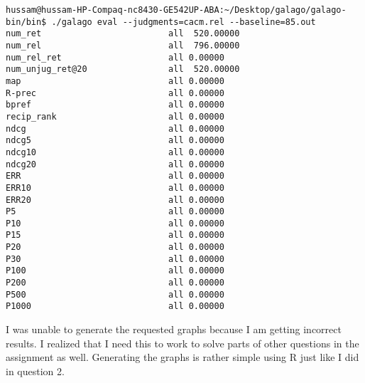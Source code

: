 \begin{lstlisting}[breakatwhitespace=〈false)]
hussam@hussam-HP-Compaq-nc8430-GE542UP-ABA:~/Desktop/galago/galago-bin/bin$ ./galago eval --judgments=cacm.rel --baseline=85.out
num_ret                     	all  520.00000
num_rel                     	all  796.00000
num_rel_ret                 	all	0.00000
num_unjug_ret@20            	all  520.00000
map                         	all	0.00000
R-prec                      	all	0.00000
bpref                       	all	0.00000
recip_rank                  	all	0.00000
ndcg                        	all	0.00000
ndcg5                       	all	0.00000
ndcg10                      	all	0.00000
ndcg20                      	all	0.00000
ERR                         	all	0.00000
ERR10                       	all	0.00000
ERR20                       	all	0.00000
P5                          	all	0.00000
P10                         	all	0.00000
P15                         	all	0.00000
P20                         	all	0.00000
P30                         	all	0.00000
P100                        	all	0.00000
P200                        	all	0.00000
P500                        	all	0.00000
P1000                       	all	0.00000
\end{lstlisting}


I was unable to generate the requested graphs because I am getting incorrect results. I realized that I need this to work to solve parts of other questions in the assignment as well. Generating the graphs is rather simple using R just like I did in question 2.

